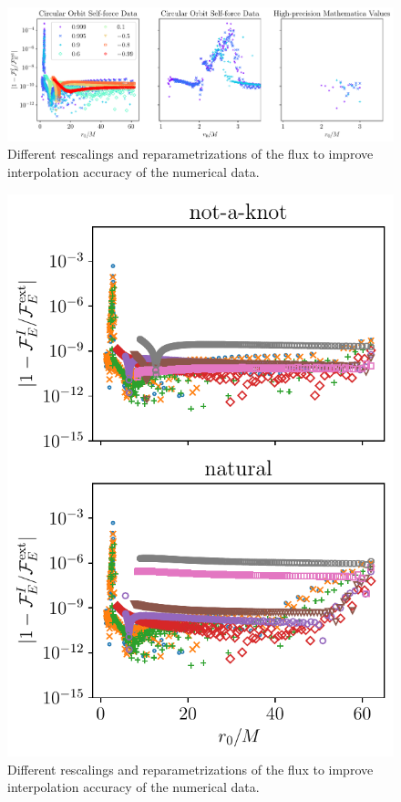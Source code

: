 \documentclass[%
 reprint,
 nofootinbib,
 amsmath,amssymb,
 aps,
 prd,
]{revtex4-2}
\begin{document}
\begin{figure}[bhtp]
    \centering
    \includegraphics[width=0.95\linewidth]{figures/flux_comparison.pdf}
    \caption{Different rescalings and reparametrizations of the flux to improve interpolation accuracy of the numerical data.}
    \label{fig:fluxComparison}
\end{figure}

\begin{figure}[bhtp]
    \centering
    \includegraphics[width=0.95\linewidth]{figures/boundary_condition_comparison.pdf}
    \caption{Different rescalings and reparametrizations of the flux to improve interpolation accuracy of the numerical data.}
    \label{fig:fluxComparison2}
\end{figure}
\end{document}
